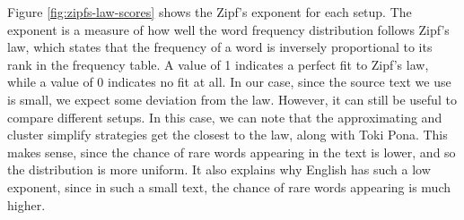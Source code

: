 Figure \ref{fig:zipfs-law-scores} shows the Zipf's exponent for each setup. The exponent is a measure of how well the word frequency distribution follows Zipf's law,
which states that the frequency of a word is inversely proportional to its rank in the frequency table.
A value of 1 indicates a perfect fit to Zipf's law, while a value of 0 indicates no fit at all. In our case, since the source text we use is small, we expect
some deviation from the law. However, it can still be useful to compare different setups. In this case, we can note that the approximating and cluster simplify strategies
get the closest to the law, along with Toki Pona. This makes sense, since the chance of rare words appearing in the text is lower, and so the distribution is more uniform.
It also explains why English has such a low exponent, since in such a small text, the chance of rare words appearing is much higher.



